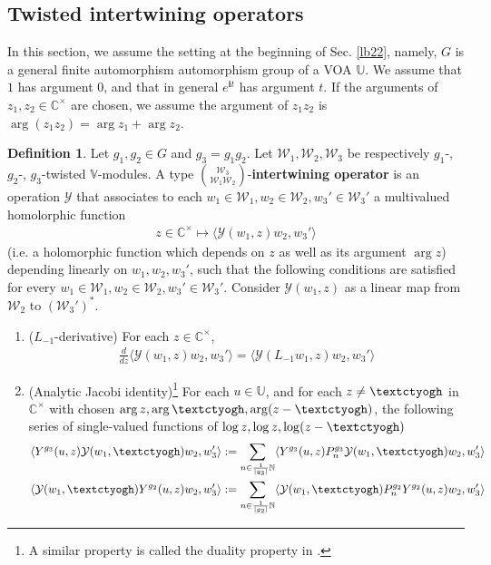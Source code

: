 \documentclass[11pt,b5paper,notitlepage]{article}
\theoremstyle{definition}
\newtheorem{df}{Definition}[subsection]
\theoremstyle{plain}
\newcommand{\mc}{\mathcal}
\newcommand{\bk}[1]{\langle {#1}\rangle}
\newcommand{\im}{\mathbf{i}}
\newcommand{\Vbb}{\mathbb V}
\newcommand{\Ubb}{\mathbb U}
\newcommand{\Cbb}{\mathbb C}
\newcommand{\Nbb}{\mathbb N}
\newcommand{\tipaz}{\text{\textctyogh}}
\numberwithin{equation}{subsection}
\begin{document}
\subsection{Twisted intertwining operators}


In this section, we assume the setting at the beginning of Sec. \ref{lb22}, namely, $G$ is a general finite automorphism automorphism group of a VOA $\Ubb$. We assume that $1$ has argument $0$, and that in general $e^{\im t}$ has argument $t$. If the arguments of $z_1,z_2\in\Cbb^\times$ are chosen, we assume the argument of $z_1z_2$ is $\arg(z_1z_2)=\arg z_1+\arg z_2$.


\begin{df}\label{lb51}
Let $g_1,g_2\in G$ and $g_3=g_1g_2$. Let $\mc W_1,\mc W_2,\mc W_3$ be respectively $g_1$-,  $g_2$-, $g_3$-twisted $\Vbb$-modules. A type $\mc W_3\choose\mc W_1\mc W_2$-\textbf{intertwining operator} is an operation $\mc Y$ that associates to each $w_1\in\mc W_1,w_2\in\mc W_2,w_3'\in\mc W_3'$ a multivalued homolorphic function
\begin{align*}
z\in\Cbb^\times\mapsto \bk{\mc Y(w_1,z)w_2,w_3'}	
\end{align*}
(i.e. a holomorphic function which depends on $z$ as well as its argument $\arg z$) depending linearly on $w_1,w_2,w_3'$, such that the following conditions are satisfied for every $w_1\in\mc W_1,w_2\in\mc W_2,w_3'\in\mc W_3'$. Consider $\mc Y(w_1,z)$ as a linear map from $\mc W_2$ to $(\mc W_3')^*$.
\begin{enumerate}
\item ($L_{-1}$-derivative)	For each $z\in\Cbb^\times$,
\begin{align}
\frac d{dz}\bk{\mc Y(w_1,z)w_2,w_3'}=\bk{\mc Y(L_{-1}w_1,z)w_2,w_3'}	\label{eq81}
\end{align}
\item (Analytic Jacobi identity)\footnote{A similar property is called the duality property in \cite[Def. 4.1]{Hua18}.}  For each $u\in\Ubb$, and for each $z\neq \tipaz$ in $\Cbb^\times$ with chosen $\arg z,\arg \tipaz,\arg(z-\tipaz)$, the following series of single-valued functions of $\log z,\log z,\log(z-\tipaz)$
\begin{gather}
	\bk{Y^{g_3}(u,z)\mc Y(w_1,\tipaz)w_2,w_3'}:=\sum_{n\in\frac 1{|g_3|}\Nbb}	\bk{Y^{g_3}(u,z)P_n^{g_3}\mc Y(w_1,\tipaz)w_2,w_3'}\label{eq76}\\
	\bk{\mc Y(w_1,\tipaz)Y^{g_2}(u,z)w_2,w_3'}:=\sum_{n\in\frac 1{|g_2|}\Nbb}	\bk{\mc Y(w_1,\tipaz)P_n^{g_2}Y^{g_2}(u,z)w_2,w_3'}\label{eq77}\\

\end{gather}
\end{enumerate}
\end{df}
\end{document}
